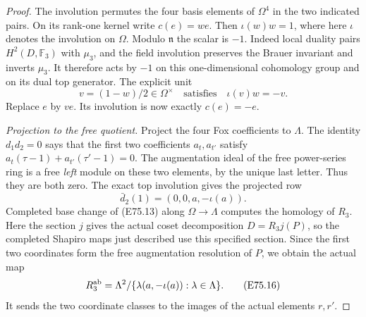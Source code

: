\begin{proof}
The involution permutes the four basis elements
of $\Omega^4$ in the two indicated pairs. On its
rank-one kernel write $c(e)=w e$.
Then $\iota(w)w=1$, where here $\iota$ denotes
the involution on $\Omega$. Modulo $\mathfrak n$
the scalar is $-1$. Indeed local duality pairs
$H^2(D,\mathbb F_3)$ with $\mu_3$, and the
field involution preserves the Brauer invariant
and inverts $\mu_3$. It therefore acts by $-1$
on this one-dimensional cohomology group and
on its dual top generator. The explicit unit
\[
 v=(1-w)/2\in\Omega^\times
 \quad\text{satisfies}\quad
 \iota(v)w=-v.
 \tag{E75.14}
\]
Replace $e$ by $ve$. Its involution is now
exactly $c(e)=-e$.

\emph{Projection to the free quotient.}
Project the four Fox coefficients to $\Lambda$.
The identity $d_1d_2=0$ says that the first two
coefficients $a_t,a_{t'}$ satisfy
$a_t(\tau-1)+a_{t'}(\tau'-1)=0$.
The augmentation ideal of the free power-series
ring is a free \emph{left} module on these two
elements, by the unique last letter. Thus they
are both zero. The exact top involution gives
the projected row
\[
 \bar d_2(1)=(0,0,a,-\iota(a)).
 \tag{E75.15}
\]
Completed base change of (E75.13) along
$\Omega\to\Lambda$ computes the homology of
$R_3$. Here the section $j$ gives the actual
coset decomposition $D=R_3j(P)$, so the
completed Shapiro maps just described use this
specified section. Since the first two
coordinates form the free augmentation
resolution of $P$, we obtain the actual map
\[
 R_3^{\rm ab}
   =\Lambda^2/\{\lambda(a,-\iota(a)):\lambda\in\Lambda\}.
 \tag{E75.16}
\]
It sends the two coordinate classes to the
images of the actual elements $r,r'$.


\end{proof}
